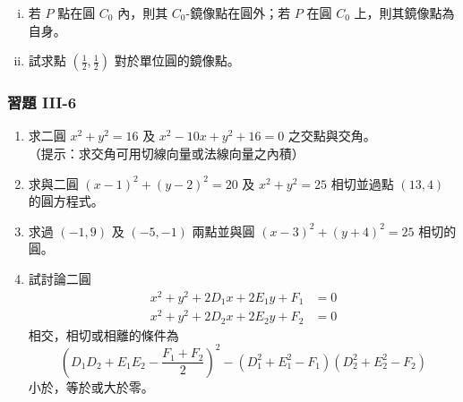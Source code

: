 \begin{exercise}
\begin{enumerate}[(i)]
  \item 若 $P$ 點在圓 $C_0$ 內，則其 $C_0$-鏡像點在圓外；若 $P$ 在圓 $C_0$ 上，則其鏡像點為自身。
  \item 試求點 $(\frac{1}{2}, \frac{1}{2})$ 對於單位圓的鏡像點。
\end{enumerate}
\end{exercise}

\subsubsection*{習題 III-6}

\begin{enumerate}
  \item 求二圓 $x^2 + y^2 = 16$ 及 $x^2 - 10x + y^2 + 16 = 0$ 之交點與交角。\\
  （提示：求交角可用切線向量或法線向量之內積）

  \item 求與二圓 $(x-1)^2 + (y-2)^2 = 20$ 及 $x^2 + y^2 = 25$ 相切並過點 $(13, 4)$ 的圓方程式。

  \item 求過 $(-1, 9)$ 及 $(-5, -1)$ 兩點並與圓 $(x-3)^2 + (y+4)^2 = 25$ 相切的圓。

  \item 試討論二圓
  \begin{align*}
  x^2 + y^2 + 2D_1x + 2E_1y + F_1 &= 0 \\
  x^2 + y^2 + 2D_2x + 2E_2y + F_2 &= 0
  \end{align*}
  相交，相切或相離的條件為
  \[ \left(D_1D_2 + E_1E_2 - \frac{F_1 + F_2}{2}\right)^2 - (D_1^2 + E_1^2 - F_1)(D_2^2 + E_2^2 - F_2) \]
  小於，等於或大於零。
\end{enumerate}
